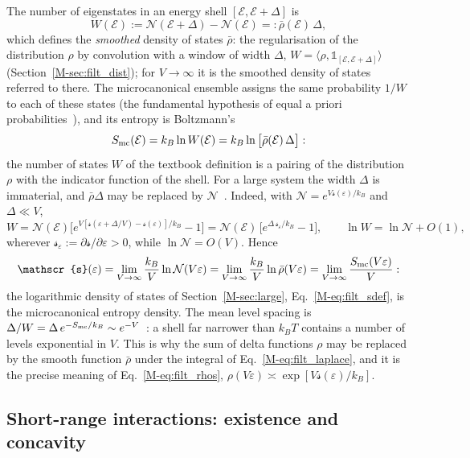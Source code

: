 \documentclass[10pt,a4paper]{article}
\theoremstyle{plain}
\theoremstyle{remark}
\newcommand{\cN}{\mathcal{N}}   %
\newcommand{\enrg}{\mathcal{E}}  %
\newcommand{\lds}{\mathscr{s}}  %
\begin{document}
The number of eigenstates in an energy shell $[\enrg,\enrg+\Delta]$ is
\begin{equation}\label{eq:filt_W}
  W(\enrg):=\cN(\enrg+\Delta)-\cN(\enrg)=:\bar\rho(\enrg)\,\Delta ,
\end{equation}
which defines the \emph{smoothed} density of states $\bar\rho$: the
regularisation of the distribution $\rho$ by convolution with a window of
width $\Delta$, $W=\langle \rho,\mathbb 1_{[\enrg,\enrg+\Delta]}\rangle$
(Section~\ref{M-sec:filt_dist}); for $V\to\infty$ it is the smoothed density of
states referred to there. The microcanonical ensemble assigns the same
probability $1/W$ to each of these states (the fundamental hypothesis of
equal a priori probabilities~\cite[Eq.~(2.2.8)]{Schwabl}), and its entropy
is Boltzmann's~\cite[Eq.~(2.3.4)]{Schwabl}
\begin{equation}\label{eq:filt_Smc}
  S_{\rm mc}(\enrg)=k_B\ln W(\enrg)=k_B\ln\big[\bar\rho(\enrg)\,\Delta\big] :
\end{equation}
the number of states $W$ of the textbook definition is a pairing of the
distribution $\rho$ with the indicator function of the shell. For a large
system the width $\Delta$ is immaterial, and $\bar\rho\Delta$ may be
replaced by $\cN$~\cite[Eq.~(2.3.6)]{Schwabl}. Indeed, with
$\cN=e^{V\lds(\varepsilon)/k_B}$ and $\Delta\ll V$,
\[
  W=\cN(\enrg)\Big[e^{V[\lds(\varepsilon+\Delta/V)-\lds(\varepsilon)]/k_B}-1\Big]
  =\cN(\enrg)\,\big[e^{\Delta\,\lds_\varepsilon/k_B}-1\big] ,
  \qquad
  \ln W=\ln\cN+O(1) ,
\]
wherever $\lds_\varepsilon:=\partial \lds/\partial\varepsilon>0$, while
$\ln\cN=O(V)$. Hence
\begin{equation}\label{eq:filt_sg}
  \lds(\varepsilon)=\lim_{V\to\infty}\frac{k_B}{V}\ln\cN(V\varepsilon)
  =\lim_{V\to\infty}\frac{k_B}{V}\ln\bar\rho(V\varepsilon)
  =\lim_{V\to\infty}\frac{S_{\rm mc}(V\varepsilon)}{V} :
\end{equation}
the logarithmic density of states of Section~\ref{M-sec:large},
Eq.~\eqref{M-eq:filt_sdef}, is the microcanonical entropy density. The mean
level spacing is
$\Delta/W=\Delta\,e^{-S_{\rm mc}/k_B}\sim e^{-V}$~\cite[Eq.~(2.3.7)]{Schwabl}:
a shell far narrower than $k_BT$ contains a number of levels exponential in
$V$. This is why the sum of delta functions $\rho$ may be replaced by the
smooth function $\bar\rho$ under the integral of Eq.~\eqref{M-eq:filt_laplace},
and it is the precise meaning of Eq.~\eqref{M-eq:filt_rhos},
$\rho(V\varepsilon)\asymp\exp[V\lds(\varepsilon)/k_B]$.

\subsection{Short-range interactions: existence and concavity}
\label{sec:second_conc}
\end{document}
